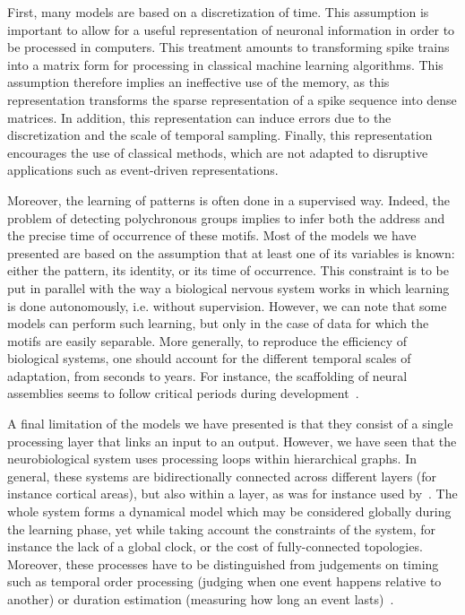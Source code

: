 \documentclass[brainsci, %
               review,submit,pdftex,moreauthors
               ]{Definitions/mdpi}
\begin{document}
First, many models are based on a discretization of time. This assumption is important to allow for a useful representation of neuronal information in order to be processed in computers. This treatment amounts to transforming spike trains into a matrix form for processing in classical machine learning algorithms. This assumption therefore implies an ineffective use of the memory, as this representation transforms the sparse representation of a spike sequence into dense matrices. In addition, this representation can induce errors due to the discretization and the scale of temporal sampling. Finally, this representation encourages the use of classical methods, which are not adapted to disruptive applications such as event-driven representations.

Moreover, the learning of patterns is often done in a supervised way. Indeed, the problem of detecting polychronous groups implies to infer both the address and the precise time of occurrence of these motifs. Most of the models we have presented are based on the assumption that at least one of its variables is known: either the pattern, its identity, or its time of occurrence. This constraint is to be put in parallel with the way a biological nervous system works in which learning is done autonomously, i.e. without supervision. However, we can note that some models can perform such learning, but only in the case of data for which the motifs are easily separable. More generally, to reproduce the efficiency of biological systems, one should account for the different temporal scales of adaptation, from seconds to years. For instance, the scaffolding of neural assemblies seems to follow critical periods during development~\citep{dard_rapid_2022}.

A final limitation of the models we have presented is that they consist of a single processing layer that links an input to an output. However, we have seen that the neurobiological system uses processing loops within hierarchical graphs. In general, these systems are bidirectionally connected across different layers (for instance cortical areas), but also within a layer, as was for instance used by~\citet{izhikevich_polychronization_2006}. The whole system forms a dynamical model which may be considered globally during the learning phase, yet while taking account the constraints of the system, for instance the lack of a global clock, or the cost of fully-connected topologies. Moreover,  these processes have to be distinguished from judgements on timing such as temporal order processing (judging when one event happens relative to another) or duration estimation (measuring how long an event lasts)~\citep{coull_distinction_2022}.
%
\end{document}
